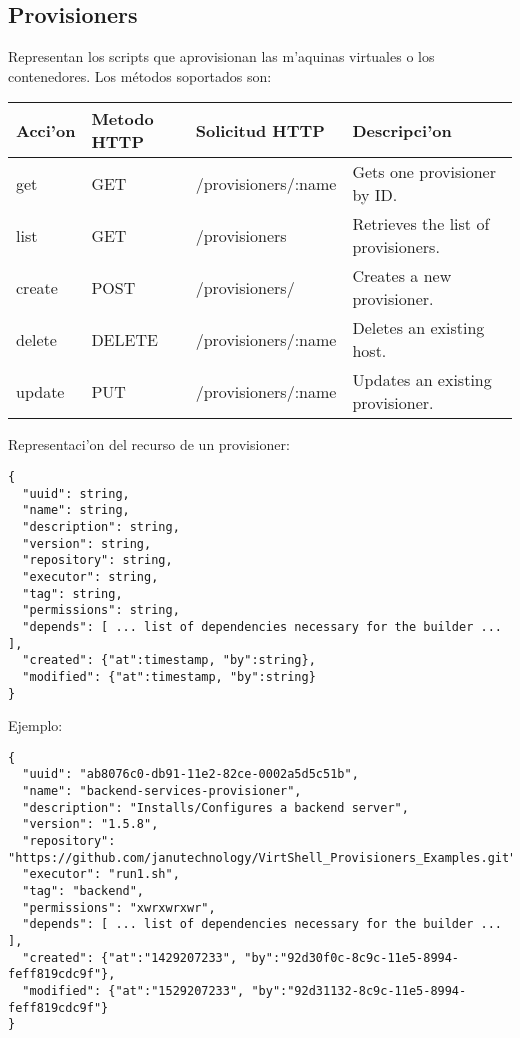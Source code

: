 \subsection{Provisioners}
Representan los scripts que aprovisionan las m'aquinas virtuales o los contenedores. Los métodos soportados son:

\begin{center}
 \begin{tabular}{| l | l | l | l |}
 \hline
  \rowcolor{blueapi}
  \textbf{Acci'on} & \textbf{Metodo HTTP} & \textbf{Solicitud HTTP} & \textbf{Descripci'on} \\ [0.5ex] 
  \hline\hline
  get & GET & /provisioners/:name & Gets one provisioner by ID. \\
  \hline
  list & GET & /provisioners & Retrieves the list of provisioners. \\
  \hline  
  create & POST & /provisioners/ & Creates a new provisioner. \\
  \hline
  delete & DELETE & /provisioners/:name & Deletes an existing host. \\
  \hline  
  update & PUT & /provisioners/:name & Updates an existing provisioner. \\ [1ex] 
  \hline
\end{tabular}
\end{center}

Representaci'on del recurso de un provisioner:

\medskip
\begin{lstlisting}[style=json]
{
  "uuid": string,
  "name": string,
  "description": string,
  "version": string,
  "repository": string,
  "executor": string,
  "tag": string,
  "permissions": string,
  "depends": [ ... list of dependencies necessary for the builder ... ],
  "created": {"at":timestamp, "by":string},
  "modified": {"at":timestamp, "by":string}
}

\end{lstlisting}

Ejemplo:

\medskip
\begin{lstlisting}[style=json]
{
  "uuid": "ab8076c0-db91-11e2-82ce-0002a5d5c51b",
  "name": "backend-services-provisioner",
  "description": "Installs/Configures a backend server",
  "version": "1.5.8",
  "repository": "https://github.com/janutechnology/VirtShell_Provisioners_Examples.git",
  "executor": "run1.sh",
  "tag": "backend",
  "permissions": "xwrxwrxwr",
  "depends": [ ... list of dependencies necessary for the builder ... ],
  "created": {"at":"1429207233", "by":"92d30f0c-8c9c-11e5-8994-feff819cdc9f"},
  "modified": {"at":"1529207233", "by":"92d31132-8c9c-11e5-8994-feff819cdc9f"}
}
\end{lstlisting}

